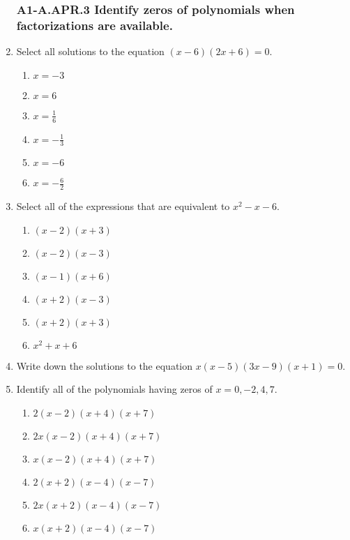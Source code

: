 \documentclass[12pt, twoside]{article}
\begin{document}
\begin{enumerate}
\subsubsection*{A1-A.APR.3 Identify zeros of polynomials when factorizations are available.}
\item Select all solutions to the equation $(x-6)(2x+6)=0$.
    \begin{multicols}{3}
    \begin{enumerate}
        \item $x= -3$
        \item $x= 6$
        \item $x=\frac{1}{6}$
        \item $x= -\frac{1}{3}$
        \item $x= -6$
        \item $x=-\frac{6}{2}$
    \end{enumerate}
    \end{multicols}

\item Select all of the expressions that are equivalent to $x^2-x-6$.
    \begin{multicols}{2}
    \begin{enumerate}
        \item $(x-2)(x+3)$
        \item $(x-2)(x-3)$ 
        \item $(x-1)(x+6)$ 
        \item $(x+2)(x-3)$ 
        \item $(x+2)(x+3)$ 
        \item $x^2+x+6$
    \end{enumerate} 
    \end{multicols}

\item Write down the solutions to the equation $x(x-5)(3x-9)(x+1)=0$. \vspace{2cm}

\item Identify all of the polynomials having zeros of $x = 0, -2, 4, 7$.
\begin{multicols}{2}
    \begin{enumerate}
        \item $2(x-2)(x+4)(x+7)$
        \item $2x(x-2)(x+4)(x+7)$ 
        \item $x(x-2)(x+4)(x+7)$ 
        \item $2(x+2)(x-4)(x-7)$ 
        \item $2x(x+2)(x-4)(x-7)$
        \item $x(x+2)(x-4)(x-7)$ 
    \end{enumerate} 
    \end{multicols}


\end{enumerate}
\end{document}
